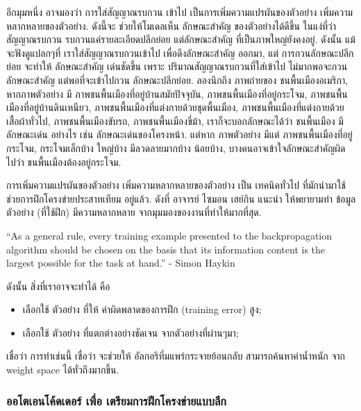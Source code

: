 อีกมุมหนึ่ง อาจมองว่า การใส่สัญญาณรบกวน เข้าไป เป็นการเพิ่มความแปรผันของตัวอย่าง เพิ่มความหลากหลายของตัวอย่าง.
ดังนี้จะ ช่วยให้โมเดลเห็น ลักษณะสำคัญ ของตัวอย่างได้ดีขึ้น ในแง่ที่ว่า สัญญาณรบกวน รบกวนแค่รายละเอียดปลีกย่อย แต่ลักษณะสำคัญ ที่เป็นภาพใหญ่ยังคงอยู่.
ดังนั้น แม้จะฟังดูแปลกๆที่ เราใส่สัญญาณรบกวนเข้าไป เพื่อดึงลักษณะสำคัญ ออกมา, แต่ การกวนลักษณะปลีกย่อย จะทำให้ ลักษณะสำคัญ เด่นชัดขึ้น เพราะ 
ปริมาณสัญญาณรบกวนที่ใส่เข้าไป ไม่มากพอจะกวน ลักษณะสำคัญ แต่พอที่จะเข้าไปกวน ลักษณะปลีกย่อย.
ลองนึกถึง ภาพถ่ายของ ชนพื้นเมืองอเมริกา,
หากภาพตัวอย่าง มี ภาพชนพื้นเมืองที่อยู่บ้านสมัยปัจจุบัน, ภาพชนพื้นเมืองที่อยู่กระโจม, 
ภาพชนพื้นเมืองที่อยู่บ้านดินเหนียว, ภาพชนพื้นเมืองที่แต่งกายด้วยชุดพื้นเมือง, ภาพชนพื้นเมืองที่แต่งกายด้วยเสื้อผ้าทั่วไป, ภาพชนพื้นเมืองขับรถ, ภาพชนพื้นเมืองขี่ม้า,
เราก็จะบอกลักษณะได้ว่า ชนพื้นเมือง มีลักษณะเด่น อย่างไร เช่น ลักษณะเด่นของโครงหน้า.
แต่หาก ภาพตัวอย่าง มีแต่ ภาพชนพื้นเมืองที่อยู่กระโจม, กระโจมเล็กบ้าง ใหญ่บ้าง มีลวดลายมากบ้าง น้อยบ้าง, บางคนอาจเข้าใจลักษณะสำคัญผิด ไปว่า ชนพื้นเมืองต้องอยู่กระโจม.

\begin{minipage}{5.5in}
{\small
\begin{shaded}
การเพิ่มความแปรผันของตัวอย่าง เพิ่มความหลากหลายของตัวอย่าง เป็น เทคนิคทั่วไป ที่มักนำมาใช้ช่วยการฝึกโครงข่ายประสาทเทียม อยู่แล้ว.
ดังที่
อาจารย์ ไซมอน เฮย์กิน แนะนำ %
ให้พยายามทำ
 ข้อมูลตัวอย่าง (ที่ใช้ฝึก) มีความหลากหลาย จากมุมมองของงานที่ทำให้มากที่สุด.

``As a general rule, every training example presented to the backpropagation algorithm should be chosen on the basis that its information content is the largest possible for the task at hand.''
- Simon Haykin\cite[pp. 175]{Haykin2009a}

ดังนั้น สิ่งที่เราอาจจะทำได้ คือ
\begin{itemize}
\item เลือกใช้ ตัวอย่าง ที่ให้ ค่าผิดพลาดของการฝึก (training error) สูง;
\item เลือกใช้ ตัวอย่าง ที่แตกต่างอย่างชัดเจน จากตัวอย่างที่ผ่านๆมา;
\end{itemize}
เชื่อว่า การทำเช่นนี้ เชื่อว่า จะช่วยให้ อัลกอริทึ่มแพร่กระจายย้อนกลับ สามารถค้นหาค่าน้ำหนัก จาก weight space ได้ทั่วถึงมากขึ้น.
\end{shaded}
}%
\end{minipage}

\subsubsection{ออโตเอนโค้ดเดอร์ เพื่อ เตรียมการฝึกโครงข่ายแบบลึก}
\label{deep: stacked autoencoder}

